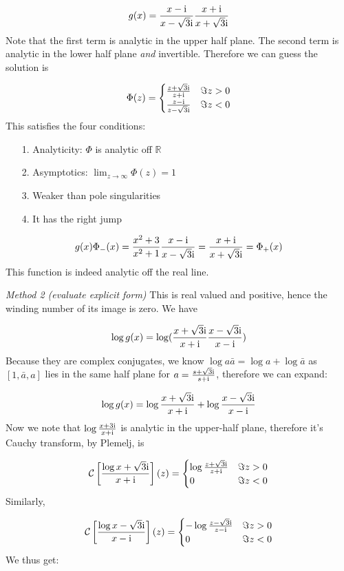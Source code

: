 \documentclass[12pt,a4paper]{article}
\def\I{ {\rm i} }
\def\R{ {\mathbb R} }
\def\CC{ {\cal C} }
\def\br[#1]{\left[{#1}\right]}
\begin{document}
\[
g(x) = {x-\I \over x-\sqrt{3} \I} {x+\I \over x+\sqrt{3} \I}
\]
Note that the first term is analytic in  the upper half plane. The second term is analytic in the lower half plane \emph{and} invertible. Therefore we can guess the solution is 

\[
\Phi(z)  = \begin{cases}
        {z+\sqrt 3\I \over z+\I} & \Im z > 0 \\
            {z-\I \over z-\sqrt 3\I} & \Im z < 0
           \end{cases}
\]
This satisfies the four conditions:

\begin{itemize}
\item[1. ] Analyticity: $\Phi$ is analytic off $\R$


\item[2. ] Asymptotics: $\lim_{z\rightarrow \infty}\Phi(z) = 1$ 


\item[3. ] Weaker than pole singularities


\item[4. ] It has the right jump

\end{itemize}
\[
g(x) \Phi_-(x) =  {x^2+3 \over x^2+1} {x-\I \over x-\sqrt 3\I}  = {x+\I \over x+\sqrt 3 \I} = \Phi_+(x)
\]
This function is indeed analytic off the real line.

\emph{Method 2 (evaluate explicit form)} This is real valued and positive, hence the winding number of its image is zero.  We have 

\[
\log g(x) = \log({x+\sqrt 3\I \over x+\I}{x-\sqrt 3\I \over x-\I}) 
\]
Because they are complex conjugates, we know $\log a \bar a = \log a + \log \bar a$ as $[1, \bar a, a]$ lies in the same half plane for $a = {s+\sqrt 3 \I \over s+ \I}$, therefore we can expand:

\[
\log g(x) = \log{x+\sqrt 3\I \over x+\I} + \log {x-\sqrt 3\I \over x-\I}
\]
Now we note that $\log{x+3\I \over x+\I}$ is analytic in the upper-half plane, therefore it's Cauchy transform, by Plemelj, is

\[
\CC\br[\log{x+\sqrt 3\I \over x+\I}](z) = \begin{cases}
        \log{z+\sqrt 3\I \over z+\I} & \Im z > 0 \\
           0 & \Im z < 0
           \end{cases}
\]
Similarly,

\[
\CC\br[\log{x-\sqrt 3\I \over x-\I}](z) = \begin{cases}
        -\log{z-\sqrt 3\I \over z-\I} & \Im z > 0 \\
           0 & \Im z < 0
           \end{cases}
\]
We thus get:
\end{document}
